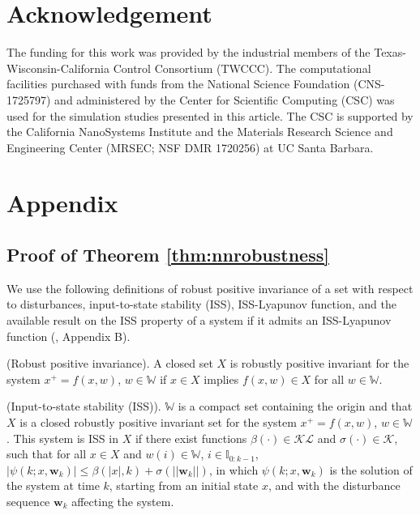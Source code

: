 \documentclass[preprint,5p, twocolumn, authoryear]{elsarticle}
\newcommand{\bbW}{\mathbb{W}}
\newcommand{\bbI}{\mathbb{I}}
\begin{document}
\section*{Acknowledgement}
The funding for this work was provided by the industrial
members of the Texas-Wisconsin-California Control 
Consortium (TWCCC).
The computational facilities purchased with funds from the National Science Foundation (CNS-1725797) and 
administered by the Center for Scientific Computing (CSC) was used for the simulation 
studies presented in this article. 
The CSC is supported by the California NanoSystems Institute and the Materials 
Research Science and Engineering Center 
(MRSEC; NSF DMR 1720256) at UC Santa Barbara.




\section*{Appendix}
\renewcommand{\thesubsection}{\Alph{subsection}}

\subsection{Proof of Theorem \ref{thm:nnrobustness}} \label{app:theorem1}

We use the following
definitions of
robust positive invariance of a set
with respect to disturbances, 
input-to-state stability (ISS), ISS-Lyapunov function,
and the available result 
on the ISS property of a system if it admits 
an ISS-Lyapunov function
(\cite*{jiang:wang:2001, 
rawlings:mayne:diehl:2017}, Appendix B).

\begin{definition} \label{def:robust_pos_invariance}
(Robust positive invariance). A closed set $X$ is 
robustly positive invariant for the system $x^+ = f(x, w)$, 
$w \in \bbW$ if $x \in X$ 
implies $f(x, w) \in X$ for all $w \in \bbW$.
\end{definition}

\begin{definition} \label{def:iss}
(Input-to-state stability (ISS)). $\bbW$ is a compact 
set containing the origin and that $X$ is a closed robustly
positive invariant set for the 
system $x^+ = f(x, w)$, $w \in \bbW$. This
system is ISS in $X$ if there exist functions 
$\beta(\cdot) \in \mathcal{K}\mathcal{L}$ and 
$\sigma(\cdot) \in \mathcal{K}$, such that for all
$x \in X$ and $w(i) \in \bbW$, $i \in \bbI_{0:k-1}$, 
$\vert \psi(k; x, \mathbf{w}_k) \vert \leq \beta(\vert x\vert, k) 
+ \sigma(\vert \vert \mathbf{w}_k\vert \vert)$, in which 
$\psi(k; x, \mathbf{w}_k)$ is the solution of the system 
at time $k$, starting from an initial state $x$, and with the
disturbance sequence $\mathbf{w}_k$ affecting the system.
\end{definition}
\end{document}
